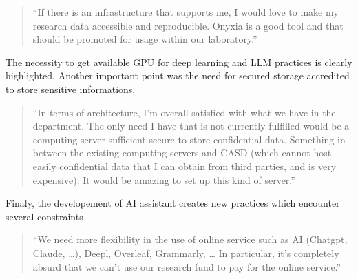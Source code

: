 \documentclass[
  letterpaper,
  DIV=11,
  numbers=noendperiod]{scrartcl}
\begin{document}
\begin{quote}
``If there is an infrastructure that supports me, I would love to make
my research data accessible and reproducible. Onyxia is a good tool and
that should be promoted for usage within our laboratory.''
\end{quote}

The necessity to get available GPU for deep learning and LLM practices
is clearly highlighted. Another important point was the need for secured
storage accredited to store sensitive informations.

\begin{quote}
``In terms of architecture, I'm overall satisfied with what we have in
the department. The only need I have that is not currently fulfilled
would be a computing server sufficient secure to store confidential
data. Something in between the existing computing servers and CASD
(which cannot host easily confidential data that I can obtain from third
parties, and is very expensive). It would be amazing to set up this kind
of server.''
\end{quote}

Finaly, the developement of AI assistant creates new practices which
encounter several constraints

\begin{quote}
``We need more flexibility in the use of online service such as AI
(Chatgpt, Claude, \ldots), Deepl, Overleaf, Grammarly, \ldots{} In
particular, it's completely absurd that we can't use our research fund
to pay for the online service.''
\end{quote}
\end{document}

